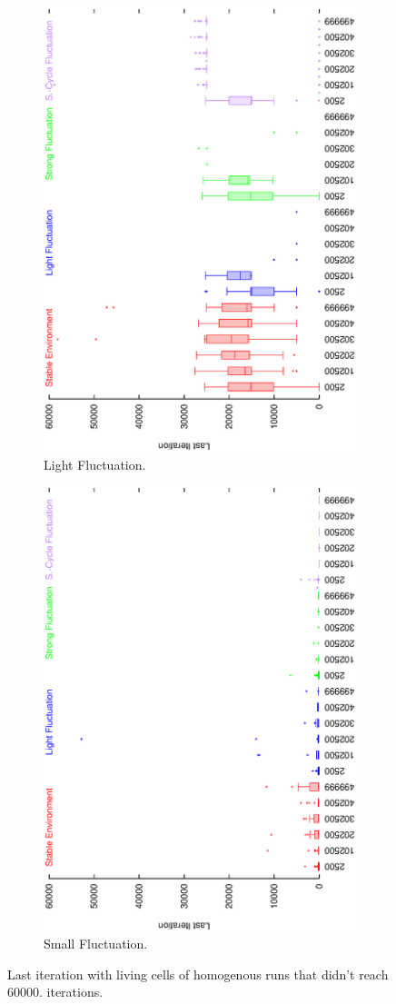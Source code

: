 \begin{figure}[H]
\begin{subfigure}{.25\textwidth}
  \centering
  \includegraphics[width=.7\linewidth, angle =-90]{img/boxendingsFailedvariationLight.eps}
  \caption{Light Fluctuation.}
  \label{fig:sfig2}
\end{subfigure}%
\begin{subfigure}{.25\textwidth}
  \centering
  \includegraphics[width=.7\linewidth, angle =-90]{img/boxendingsFailedvariationSmall.eps}
  \caption{Small Fluctuation.}
  \label{fig:sfig1}
\end{subfigure}
\caption{Last iteration with living cells of homogenous runs that didn't reach 60000. iterations.}
\label{fig:ending}
\end{figure}



